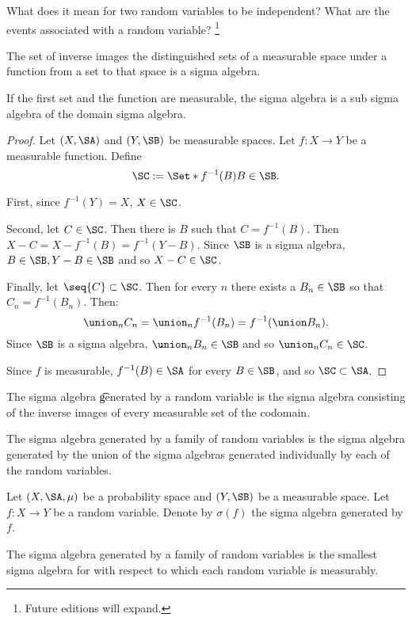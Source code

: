 

What does it mean for two random variables to be independent?
What are the events associated with a random variable?
  \ifhmode\unskip\fi\footnote{
Future editions will expand.
  }



\begin{proposition}

The set of inverse images the distinguished sets of a measurable space under a function from a set to that space is a sigma algebra.

If the first set and the function are measurable, the sigma algebra is a sub sigma algebra of the domain sigma algebra.

\begin{proof}

Let $(X, \SA)$ and $(Y, \SB)$ be measurable spaces.
Let $f: X \to Y$ be a measurable function. Define
  \[
\SC := \Set*{f^{-1}(B)}{B \in \SB}.
  \]

First, since $f^{-1}(Y) = X$, $X \in \SC$.

Second, let $C \in \SC$. Then there is $B$ such that $C = f^{-1}(B)$. Then $X - C = X - f^{-1}(B) = f^{-1}(Y - B)$.
Since $\SB$ is a sigma algebra, $B \in \SB, Y - B \in \SB$ and so $X - C \in \SC$.

Finally, let $\seq{C} \subset \SC$.
Then for every $n$ there exists a $B_n \in \SB$ so that $C_n = f^{-1}(B_n)$.
Then:
  \[
\union_{n} C_n = \union_n f^{-1}(B_n) = f^{-1}(\union B_n).
  \]
Since $\SB$ is a sigma algebra,
$\union_n B_n \in \SB$ and so $\union_{n} C_n \in \SC$.

Since $f$ is measurable, $f^{-1}(B) \in \SA$ for every $B \in \SB$, and so $\SC \subset \SA$.

\end{proof}

\end{proposition}

The sigma algebra \t{generated by a random variable} is the sigma algebra consisting of the inverse images of every measurable set of the codomain.

The sigma algebra generated by a family of random variables is the sigma algebra generated by the union of the sigma algebras generated individually by each of the random variables.


Let $(X, \SA, \mu)$ be a probability space and $(Y, \SB)$ be a measurable space.
Let $f: X \to Y$ be a random variable.
Denote by $\sigma(f)$ the sigma algebra generated by $f$.


\begin{proposition}
The sigma algebra generated by a family of random variables is the smallest sigma algebra for with respect to which each random variable is measurably.
\end{proposition}
